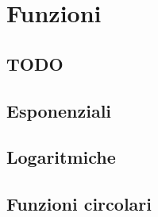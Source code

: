 
\chapter{Funzioni}

\section{TODO}

\section{Esponenziali}
\label{sec:01_esponenziali}

% 

\section{Logaritmiche}
\label{sec:02_logaritmiche}


\section{Funzioni circolari}
\label{sec:03_funzionicircolari}

